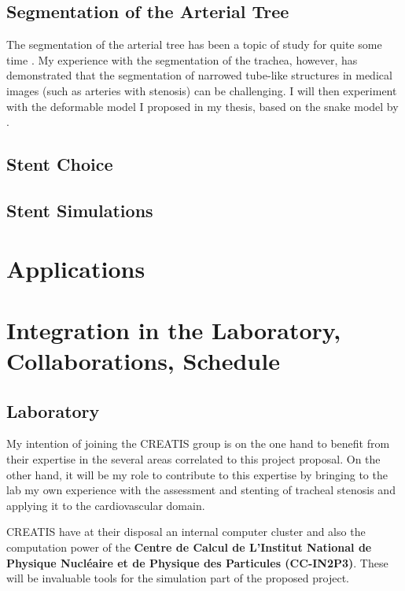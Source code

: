 \documentclass[a4paper]{article}
\begin{document}
\subsection{Segmentation of the Arterial Tree}

The segmentation of the arterial tree has been a topic of study for quite some time \cite{}. My experience with the segmentation of the trachea, however, has demonstrated that the segmentation of narrowed tube-like structures in medical images (such as arteries with stenosis) can be challenging. I will then experiment with the deformable model I proposed in my thesis, based on the snake model by \cite{Kass}.

\subsection{Stent Choice}

\subsection{Stent Simulations}

\citep{deBeule}


\section{Applications}

\section{Integration in the Laboratory, Collaborations, Schedule}

\subsection{Laboratory}

My intention of joining the CREATIS group is on the one hand to benefit from their expertise in the several areas correlated to this project proposal. On the other hand, it will be my role to contribute to this expertise by bringing to the lab my own experience with the assessment and stenting of tracheal stenosis and applying it to the cardiovascular domain.

CREATIS have at their disposal an internal computer cluster and also the computation power of the {\bf Centre de Calcul de L'Institut National de Physique Nucl\'eaire et de Physique des Particules (CC-IN2P3)}. These will be invaluable tools for the simulation part of the proposed project. 
\end{document}

